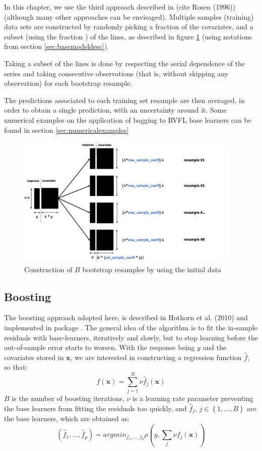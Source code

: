 \medskip

In this chapter, we use the third approach described in (cite Rosen (1996))  (although many other approaches can be envisaged). Multiple samples (training) data sets are constructed by randomly picking a fraction  of the covariates, and a subset (using the fraction ) of the lines, as described in figure \ref{bootstrap_resampling_plot} (using notations from section \ref{sec:basemodeldesc}). 

Taking a subset of the lines is done by respecting the serial dependence of the series and taking consecutive observations (that is, without skipping any observation) for each bootstrap resample. 

The predictions associated to each training set resample are then averaged, in order to obtain a single prediction, with an uncertainty around it. Some numerical examples on the application of bagging to RVFL base learners can be found in section \ref{sec:numericalexamples}

\begin{figure}[!htb]
\centering
\includegraphics[width=10.5cm]{gfx/chapter-rvfl-ensembles/bootstrap_resampling.png}
\caption{Construction of $B$ bootstrap resamples by using the initial data}
\label{bootstrap_resampling_plot}
\end{figure}

\newpage

\subsection{Boosting}
\label{sec:rvflboosting}

The boosting approach adopted here, is described in Hothorn et al. (2010) and implemented in  package . The general idea of the algorithm is to fit the in-sample residuals with base-learners, iteratively and slowly, but to stop learning before the out-of-sample error starts to worsen. With the response being $y$ and the covariates stored in  $\textbf{x}$, we are interested in constructing a regression function $\hat{f}$, so that: 
$$
\hat{f}(\textbf{x}) = \sum_{j=1}^B \nu \hat{f}_j(\textbf{x}) 
$$
$B$ is the number of boosting iterations, $\nu$ is a learning rate parameter preventing the base learners from fitting the residuals too quickly, and  $\hat{f}_j$, $j \in \left \lbrace 1, \ldots, B \right \rbrace$ are the base learners, which are obtained as: 
$$
\left(\hat{f}_1, \ldots,  \hat{f}_p\right) = argmin_{f_1, \ldots, f_p}  \rho \left( y, \sum_j \nu f_j\left( \textbf{x} \right) \right) 
$$

